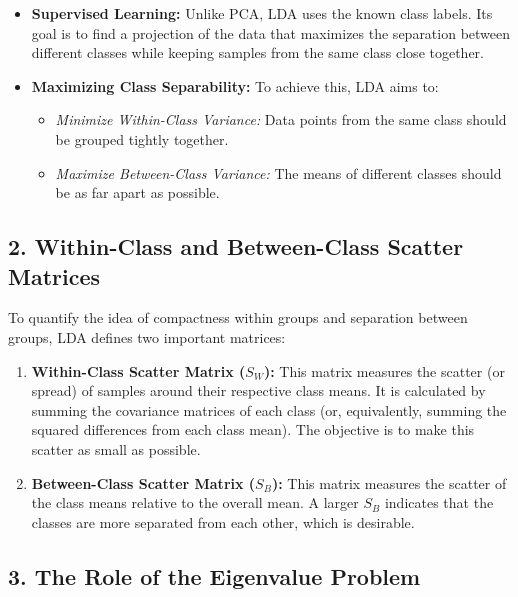 \documentclass[10pt]{article}
\begin{document}
\begin{itemize}
    \item \textbf{Supervised Learning:}  
    Unlike PCA, LDA uses the known class labels. Its goal is to find a projection of the data that maximizes the separation between different classes while keeping samples from the same class close together.
    
    \item \textbf{Maximizing Class Separability:}  
    To achieve this, LDA aims to:
    \begin{itemize}
        \item \emph{Minimize Within-Class Variance:} Data points from the same class should be grouped tightly together.
        \item \emph{Maximize Between-Class Variance:} The means of different classes should be as far apart as possible.
    \end{itemize}
\end{itemize}

\subsection*{2. Within-Class and Between-Class Scatter Matrices}

To quantify the idea of compactness within groups and separation between groups, LDA defines two important matrices:

\begin{enumerate}
    \item \textbf{Within-Class Scatter Matrix (\(S_W\)):}  
    This matrix measures the scatter (or spread) of samples around their respective class means. It is calculated by summing the covariance matrices of each class (or, equivalently, summing the squared differences from each class mean). The objective is to make this scatter as small as possible.
    
    \item \textbf{Between-Class Scatter Matrix (\(S_B\)):}  
    This matrix measures the scatter of the class means relative to the overall mean. A larger \(S_B\) indicates that the classes are more separated from each other, which is desirable.
\end{enumerate}

\subsection*{3. The Role of the Eigenvalue Problem}
\end{document}
